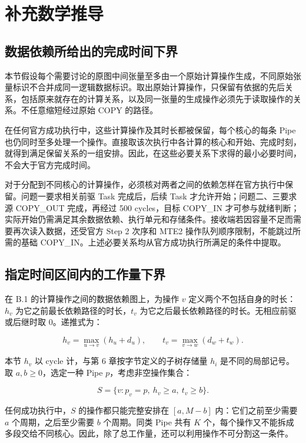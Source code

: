 \documentclass[anonymous,withtoc]{gmcm2026}
\begin{document}
\clearpage
\section{补充数学推导}

\subsection{数据依赖所给出的完成时间下界}

本节假设每个需要讨论的原图中间张量至多由一个原始计算操作生成，不同原始张量标识不合并成同一逻辑数据标识。取出原始计算操作，只保留有依据的先后关系，包括原来就存在的计算关系，以及同一张量的生成操作必须先于读取操作的关系。不任意缩短经过原始 COPY 的路径。

在任何官方成功执行中，这些计算操作及其时长都被保留，每个核心的每条 Pipe 也仍同时至多处理一个操作。直接取该次执行中各计算的核心和开始、完成时刻，就得到满足保留关系的一组安排。因此，在这些必要关系下求得的最小必要时间，不会大于官方完成时间。

对于分配到不同核心的计算操作，必须核对两者之间的依赖怎样在官方执行中保留。问题一要求相关前驱 Task 完成后，后续 Task 才允许开始；问题二、三要求源 COPY\_OUT 完成，再经过 500 cycles，目标 COPY\_IN 才可参与就绪判断；实际开始仍需满足其余数据依赖、执行单元和存储条件。接收端若因容量不足而需要再次读入数据，还受官方 Step 2 次序和 MTE2 操作队列顺序限制，不能跳过所需的基础 COPY\_IN。上述必要关系均从官方成功执行所满足的条件中提取。

\subsection{指定时间区间内的工作量下界}

在 B.1 的计算操作之间的数据依赖图上，为操作 \(v\) 定义两个不包括自身的时长：\(h_v\) 为它之前最长依赖路径的时长，\(t_v\) 为它之后最长依赖路径的时长。无相应前驱或后继时取 0。递推式为：

\begin{equation}
h_v = \max_{u \to v}(h_u + d_u), \qquad t_v = \max_{v \to w}(d_w + t_w).
\end{equation}

本节 \(h_v\) 以 cycle 计，与第 6 章按字节定义的子树存储量 \(h_i\) 是不同的局部记号。取 \(a, b \ge 0\)，选定一种 Pipe \(p\)，考虑非空操作集合：

\begin{equation}
S = \{v: p_v = p, \ h_v \ge a, \ t_v \ge b\}.
\end{equation}

任何成功执行中，\(S\) 的操作都只能完整安排在 \([a, M - b]\) 内：它们之前至少需要 \(a\) 个周期，之后至少需要 \(b\) 个周期。同类 Pipe 共有 \(K\) 个，每个操作又不能拆成多段交给不同核心。因此，除了总工作量，还可以利用操作不可分割这一条件。
\end{document}
